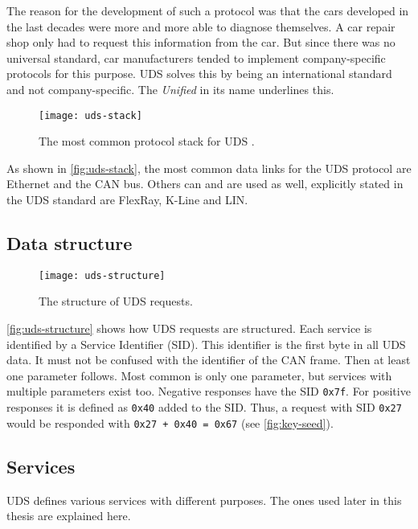 The reason for the development of such a protocol was that the cars developed in the last decades were more and more able to diagnose themselves. A car repair shop only had to request this information from the car. But since there was no universal standard, car manufacturers tended to implement company-specific protocols for this purpose. UDS solves this by being an international standard and not company-specific. The \emph{Unified} in its name underlines this. 

\begin{figure}[htb]
    \centering
    \texttt{[image: uds-stack]}
    \caption{The most common protocol stack for UDS \cite{Weiss2020}.}
    \label{fig:uds-stack}
\end{figure}

As shown in \autoref{fig:uds-stack}, the most common data links for the UDS protocol are Ethernet and the CAN bus. Others can and are used as well, explicitly stated in the UDS standard are FlexRay, K-Line and LIN.

\subsection{Data structure}

\begin{figure}[htb]
    \centering
    \texttt{[image: uds-structure]}
    \caption{The structure of UDS requests.}
    \label{fig:uds-structure}
\end{figure}

\autoref{fig:uds-structure} shows how UDS requests are structured. Each service is identified by a Service Identifier (SID). This identifier is the first byte in all UDS data. It must not be confused with the identifier of the CAN frame. Then at least one parameter follows. Most common is only one parameter, but services with multiple parameters exist too.
Negative responses have the SID \texttt{0x7f}.
For positive responses it is defined as \texttt{0x40} added to the SID. Thus, a request with SID \texttt{0x27} would be responded with \texttt{0x27 + 0x40 = 0x67} (see \autoref{fig:key-seed}).

\subsection{Services}
\label{subsubsec:uds-services}

UDS defines various services with different purposes. The ones used later in this thesis are explained here.

